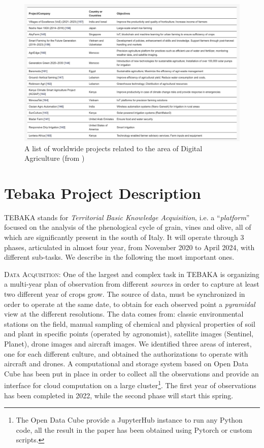 \documentclass[comsoc,final]{IEEEtran}
\begin{document}
\begin{figure}
    \centering
    \includegraphics[width=\columnwidth]{research-table}
    \caption{A list of worldwide projects related to the area of Digital Agriculture (from \cite{agriengineering4020029})}
    \label{fig:table-worldwide}
\end{figure}


\section{Tebaka Project Description}\label{sec:tebaka}

TEBAKA stands for \emph{Territorial Basic Knowledge Acquisition}, i.e. a  “\emph{platform}” focused on the analysis of the phenological cycle of grain, vines and olive, all of which are significantly present in the south of Italy. It will operate through $3$ phases, articulated in almost four year, from November 2020 to April 2024, with different sub-tasks. We describe in the following the most important ones.\medskip

\textsc{Data Acquisition:} One of the largest and complex task in TEBAKA is organizing a multi-year plan of observation from different \emph{sources} in order to capture at least two different year of crops grow. The source of data, must be synchronized in order to operate at the same date, to obtain for each observed point a \emph{pyramidal} view at the different resolutions. The data comes from: classic environmental stations on the field, manual sampling  of chemical and physical properties of soil and plant in specific points (operated by agronomist), satellite images (Sentinel, Planet), drone images and aircraft images. We identified three areas of interest, one for each different culture, and obtained the authorizations to operate with aircraft and drones. A computational and storage system based on Open Data Cube \cite{odc} has been put in place in order to collect all the observations and provide an interface for cloud computation on a large cluster\footnote{The Open Data Cube provide a JupyterHub instance to run any Python code, all the result in the paper has been obtained using Pytorch or custom scripts.}. The first year of observations has been completed in 2022, while the second phase will start this spring.\medskip
\end{document}
